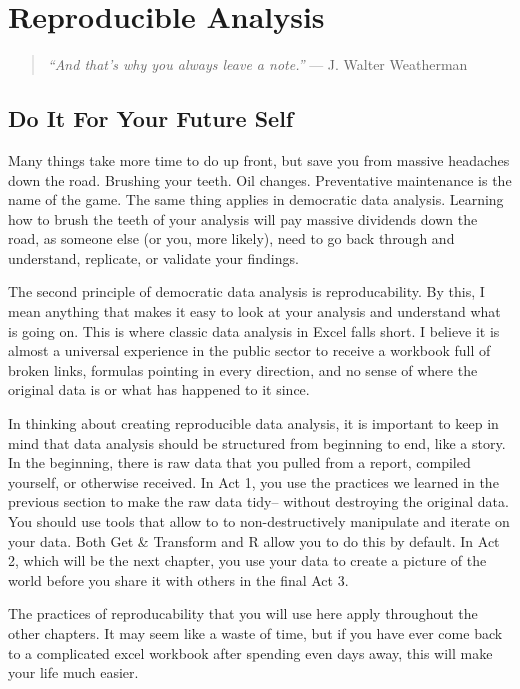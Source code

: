 \documentclass[]{book}
\begin{document}
\hypertarget{reproducible-analysis}{%
\chapter{Reproducible Analysis}\label{reproducible-analysis}}

\begin{quote}
\emph{``And that's why you always leave a note.''} --- J. Walter Weatherman
\end{quote}

\hypertarget{do-it-for-your-future-self}{%
\section{Do It For Your Future Self}\label{do-it-for-your-future-self}}

Many things take more time to do up front, but save you from massive headaches down the road. Brushing your teeth. Oil changes. Preventative maintenance is the name of the game. The same thing applies in democratic data analysis. Learning how to brush the teeth of your analysis will pay massive dividends down the road, as someone else (or you, more likely), need to go back through and understand, replicate, or validate your findings.

The second principle of democratic data analysis is reproducability. By this, I mean anything that makes it easy to look at your analysis and understand what is going on. This is where classic data analysis in Excel falls short. I believe it is almost a universal experience in the public sector to receive a workbook full of broken links, formulas pointing in every direction, and no sense of where the original data is or what has happened to it since.

In thinking about creating reproducible data analysis, it is important to keep in mind that data analysis should be structured from beginning to end, like a story. In the beginning, there is raw data that you pulled from a report, compiled yourself, or otherwise received. In Act 1, you use the practices we learned in the previous section to make the raw data tidy-- without destroying the original data. You should use tools that allow to to non-destructively manipulate and iterate on your data. Both Get \& Transform and R allow you to do this by default. In Act 2, which will be the next chapter, you use your data to create a picture of the world before you share it with others in the final Act 3.

The practices of reproducability that you will use here apply throughout the other chapters. It may seem like a waste of time, but if you have ever come back to a complicated excel workbook after spending even days away, this will make your life much easier.
\end{document}
